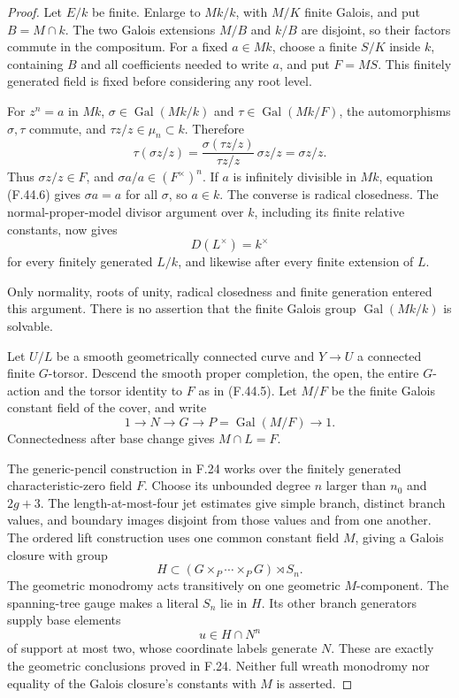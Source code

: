 \begin{proof}
Let \(E/k\) be finite. Enlarge to \(Mk/k\), with \(M/K\) finite Galois, and put \(B=M\cap k\). The two Galois extensions \(M/B\) and \(k/B\) are disjoint, so their factors commute in the compositum. For a fixed \(a\in Mk\), choose a finite \(S/K\) inside \(k\), containing \(B\) and all coefficients needed to write \(a\), and put \(F=MS\). This finitely generated field is fixed before considering any root level.

For \(z^n=a\) in \(Mk\), \(\sigma\in\operatorname{Gal}(Mk/k)\) and \(\tau\in\operatorname{Gal}(Mk/F)\), the automorphisms \(\sigma,\tau\) commute, and \(\tau z/z\in\mu_n\subset k\). Therefore
\[
 \tau(\sigma z/z)
 =\frac{\sigma(\tau z/z)}{\tau z/z}\,\sigma z/z
 =\sigma z/z.
\]
Thus \(\sigma z/z\in F\), and \(\sigma a/a\in(F^\times)^n\). If \(a\) is infinitely divisible in \(Mk\), equation \textup{(F.44.6)} gives \(\sigma a=a\) for all \(\sigma\), so \(a\in k\). The converse is radical closedness. The normal-proper-model divisor argument over \(k\), including its finite relative constants, now gives
\[
                  D(L^\times)=k^\times
 \tag{F.44.7}
\]
for every finitely generated \(L/k\), and likewise after every finite extension of \(L\).

Only normality, roots of unity, radical closedness and finite generation entered this argument. There is no assertion that the finite Galois group \(\operatorname{Gal}(Mk/k)\) is solvable.


Let \(U/L\) be a smooth geometrically connected curve and \(Y\to U\) a connected finite \(G\)-torsor. Descend the smooth proper completion, the open, the entire \(G\)-action and the torsor identity to \(F\) as in \textup{(F.44.5)}. Let \(M/F\) be the finite Galois constant field of the cover, and write
\[
 1\longrightarrow N\longrightarrow G\longrightarrow
 P=\operatorname{Gal}(M/F)\longrightarrow1.
\]
Connectedness after base change gives \(M\cap L=F\).

The generic-pencil construction in F.24 works over the finitely generated characteristic-zero field \(F\). Choose its unbounded degree \(n\) larger than \(n_0\) and \(2g+3\). The length-at-most-four jet estimates give simple branch, distinct branch values, and boundary images disjoint from those values and from one another. The ordered lift construction uses one common constant field \(M\), giving a Galois closure with group
\[
 H\subset (G\times_P\cdots\times_PG)\rtimes S_n.
 \tag{F.44.8}
\]
The geometric monodromy acts transitively on one geometric \(M\)-component. The spanning-tree gauge makes a literal \(S_n\) lie in \(H\). Its other branch generators supply base elements
\[
 u\in H\cap N^n
\]
of support at most two, whose coordinate labels generate \(N\). These are exactly the geometric conclusions proved in F.24. Neither full wreath monodromy nor equality of the Galois closure's constants with \(M\) is asserted.


\end{proof}
